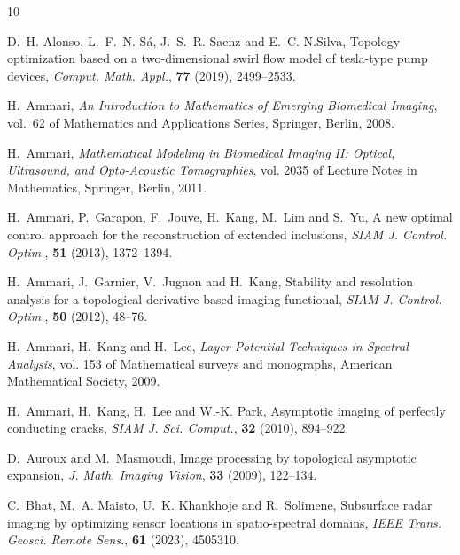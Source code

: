 \documentclass[a4,10pt]{article}
\theoremstyle{plain}
\theoremstyle{remark}
\begin{document}
\providecommand{\href}[2]{#2}
\providecommand{\arxiv}[1]{\href{http://arxiv.org/abs/#1}{arXiv:#1}}
\providecommand{\url}[1]{\texttt{#1}}
\providecommand{\urlprefix}{URL }
\begin{thebibliography}{10}

\newblock D.~H. Alonso, L.~F.~N. S{\'a}, J.~S.~R. Saenz and E.~C. N.Silva,
\newblock Topology optimization based on a two-dimensional swirl flow model of
  tesla-type pump devices,
\newblock \emph{Comput. Math. Appl.}, \textbf{77} (2019), 2499--2533.

\newblock H.~Ammari,
\newblock \emph{An Introduction to Mathematics of Emerging Biomedical Imaging},
  vol.~62 of Mathematics and Applications Series,
\newblock Springer, Berlin, 2008.

\newblock H.~Ammari,
\newblock \emph{Mathematical Modeling in Biomedical Imaging {II}: Optical,
  Ultrasound, and Opto-Acoustic Tomographies}, vol. 2035 of Lecture Notes in
  Mathematics,
\newblock Springer, Berlin, 2011.

\newblock H.~Ammari, P.~Garapon, F.~Jouve, H.~Kang, M.~Lim and S.~Yu,
\newblock A new optimal control approach for the reconstruction of extended
  inclusions,
\newblock \emph{SIAM J. Control. Optim.}, \textbf{51} (2013), 1372--1394.

\newblock H.~Ammari, J.~Garnier, V.~Jugnon and H.~Kang,
\newblock Stability and resolution analysis for a topological derivative based
  imaging functional,
\newblock \emph{SIAM J. Control. Optim.}, \textbf{50} (2012), 48--76.

\newblock H.~Ammari, H.~Kang and H.~Lee,
\newblock \emph{Layer Potential Techniques in Spectral Analysis}, vol. 153 of
  Mathematical surveys and monographs,
\newblock American Mathematical Society, 2009.

\newblock H.~Ammari, H.~Kang, H.~Lee and W.-K. Park,
\newblock Asymptotic imaging of perfectly conducting cracks,
\newblock \emph{SIAM J. Sci. Comput.}, \textbf{32} (2010), 894--922.

\newblock D.~Auroux and M.~Masmoudi,
\newblock Image processing by topological asymptotic expansion,
\newblock \emph{J. Math. Imaging Vision}, \textbf{33} (2009), 122--134.

\newblock C.~Bhat, M.~A. Maisto, U.~K. Khankhoje and R.~Solimene,
\newblock Subsurface radar imaging by optimizing sensor locations in
  spatio-spectral domains,
\newblock \emph{IEEE Trans. Geosci. Remote Sens.}, \textbf{61} (2023), 4505310.


\end{thebibliography}
\end{document}
